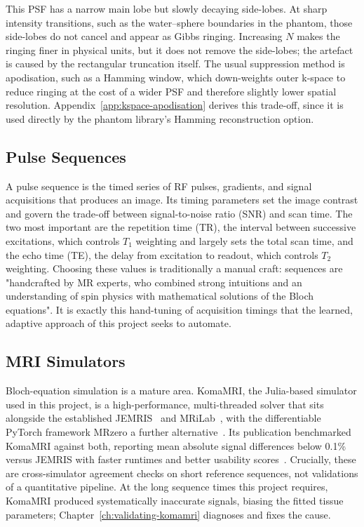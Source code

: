 This PSF has a narrow main lobe but slowly decaying side-lobes. At sharp
intensity transitions, such as the water--sphere boundaries in the
phantom, those side-lobes do not cancel and appear as Gibbs ringing.
Increasing \(N\) makes the ringing finer in physical units, but it does
not remove the side-lobes; the artefact is caused by the rectangular
truncation itself. The usual suppression method is apodisation, such as a
Hamming window, which down-weights outer k-space to reduce ringing at the
cost of a wider PSF and therefore slightly lower spatial resolution.
Appendix~\ref{app:kspace-apodisation} derives this trade-off, since it is
used directly by the phantom library's Hamming reconstruction option.


\subsection{Pulse Sequences}

A pulse sequence is the timed series of RF pulses, gradients, and signal
acquisitions that produces an image. Its timing parameters set the
image contrast and govern the trade-off between signal-to-noise ratio (SNR)
and scan time. The two most important are the repetition time (TR), the
interval between successive excitations, which controls $T_1$ weighting and
largely sets the total scan time, and the echo time (TE), the delay from
excitation to readout, which controls $T_2$ weighting. Choosing these values
is traditionally a manual craft: sequences are "handcrafted by MR experts, who
combined strong intuitions and an understanding of spin physics with
mathematical solutions of the Bloch equations"\cite{DLINMRI:24}. It is exactly
this hand-tuning of acquisition timings that the learned, adaptive approach of
this project seeks to automate.

\subsection{MRI Simulators}
Bloch-equation simulation is a mature area. KomaMRI, the Julia-based simulator
used in this project, is a high-performance, multi-threaded solver that sits
alongside the established JEMRIS~\cite{stoecker_jemris_2010} and
MRiLab~\cite{liu_mrilab_2017}, with the differentiable PyTorch framework
MRzero a further alternative~\cite{MRISeqSupLearning:21}. Its publication
benchmarked KomaMRI against both, reporting mean absolute signal differences
below 0.1\% versus JEMRIS with faster runtimes and better usability
scores~\cite{komaMRI:23}. Crucially, these are cross-simulator agreement checks
on short reference sequences, not validations of a quantitative pipeline. At
the long sequence times this project requires, KomaMRI produced systematically
inaccurate signals, biasing the fitted tissue parameters;
Chapter~\ref{ch:validating-komamri} diagnoses and fixes the cause.

